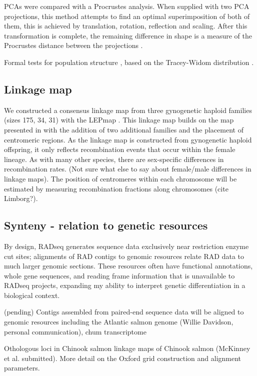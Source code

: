 \documentclass[12pt, one column]{article}
\begin{document}
PCAs were compared with a Procrustes analysis. When supplied with two PCA projections, this method attempts to find an optimal superimposition of both of them, this is achieved by  translation, rotation, reflection and scaling.  After this transformation is complete, the remaining difference in shape is a measure of the Procrustes distance between the projections \citep{Peres2001}.

Formal tests for population structure \citep{Patterson2006}, based on the Tracey-Widom distribution \citep{Tracy1994}.

\subsection*{Linkage map}

We constructed a consensus linkage map from three gynogenetic haploid families (sizes 175, 34, 31) with the  LEPmap \citep{Rastas2013}. This linkage map  builds on the map presented in \citet{Waples2015} with the addition of two additional families and the placement of centromeric regions. As the linkage map is constructed from gynogenetic haploid offspring, it only reflects recombination events that occur within the female lineage. As with many other species, there are sex-specific differences in recombination rates. (Not sure what else to say about female/male differences in linkage maps). The position of centromeres within each chromosome will be estimated by measuring recombination fractions along chromosomes (cite Limborg?).

\subsection*{Synteny - relation to genetic resources}
By design, RADseq generates sequence data exclusively near restriction enzyme cut sites; alignments of RAD contigs to genomic resources relate RAD data to much larger genomic sections.  These resources often have functional annotations, whole gene sequences, and reading frame information that is unavailable to RADseq projects, expanding my ability to interpret genetic differentiation in a biological context.

(pending)
Contigs assembled from paired-end sequence data \citet{Waples2015} will be aligned to genomic resources including the Atlantic salmon genome (Willie Davidson, personal communication), chum transcriptome \citep{Seeb2011}

Othologous loci in Chinook salmon linkage maps of Chinook salmon (McKinney et al. submitted).  More detail on the Oxford grid construction and alignment parameters.
\end{document}

